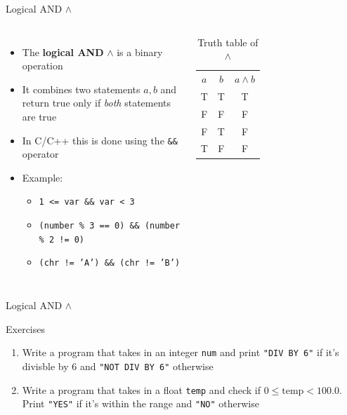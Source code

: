 \documentclass[10pt,xcolor={table,dvipsnames},t]{beamer}
\begin{document}
\begin{frame}{Logical AND $\land$}
  \begin{columns}
    \begin{itemize}
      \item The \textbf{logical AND} $\land$ is a binary operation
      \item It combines two statements $a,b$ and return true only if \textit{both} statements are true 
      \item In C/C++ this is done using the \texttt{\&\&} operator
      \item Example:
      \begin{itemize}
        \item \texttt{1 <= var \&\& var < 3} 
        \item \texttt{(number \% 3 == 0)  \&\& (number \% 2 != 0)}
        \item \texttt{(chr != 'A') \&\& (chr != 'B')}
      \end{itemize}
    \end{itemize}
    \begin{table}[]
      \begin{tabular}{ccc}
      $a$ & $b$ & $a\land b$  \\
      T & T & T \\
      F & F & F \\
      F & T & F\\
      T & F & F
      \end{tabular}
      \caption{Truth table of $\land$}
      \end{table}
  \end{columns}
\end{frame}

\begin{frame}{Logical AND $\land$}
  \begin{exampleblock}{Exercises}
    \begin{enumerate}
      \item Write a program that takes in an integer \texttt{num} and print \texttt{"DIV BY 6"} if it's divisble by 6 and \texttt{"NOT DIV BY 6"} otherwise
      \item Write a program that takes in a float \texttt{temp} and check if $0\leq \text{temp} < 100.0 $. Print \texttt{"YES"} if it's within the range and \texttt{"NO"} otherwise 
    \end{enumerate}
  \end{exampleblock}
\end{frame}
\end{document}
